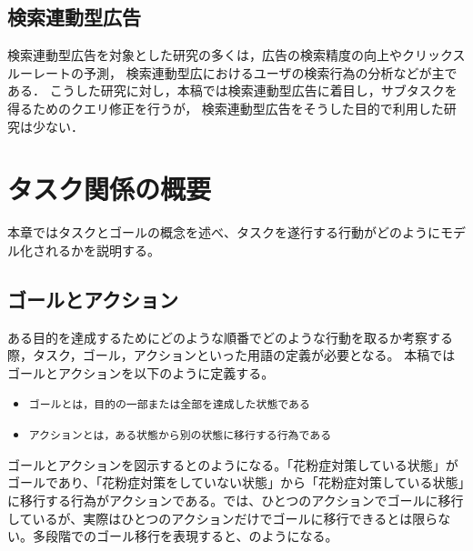 \documentclass[submit,techreq]{ipsj}
\def\|{\verb|}
\begin{document}
\subsection{検索連動型広告}
検索連動型広告を対象とした研究の多くは，広告の検索精度の向上\cite{BroderAdQueryExpansion}やクリックスルーレートの予測\cite{RichardsonEstimatingCTR}，
検索連動型広におけるユーザの検索行為の分析\cite{jansen2005examining,DanescuNiculescuMizilInterplayAd}などが主である．
こうした研究に対し，本稿では検索連動型広告に着目し，サブタスクを得るためのクエリ修正を行うが，
検索連動型広告をそうした目的で利用した研究は少ない\cite{yamamoto2012wisdom}．

%%あれ，これ日本語の文献なくね？？
%本稿では検索連動型広告に着目し，サブタスクを得るためのクエリ修正を行うが，
%検索連動型広告に着目した同様の研究として，田麦らの研究がある．
%田麦らは，``中古ギターを売りたい''という情報要求を持ったユーザの場合，``中古ギター　売却''というクエリでウェブ検索を行うよりも，``中古ギター　買い取り''というように，中古ギターの買い取り業者というサービス提供者側の視点に立ったクエリでウェブ検索をした方が，
%目的に適したページを得られやすいことを指摘している．
%彼らはこの点に着目し，検索連動型広告を用いることで，``売却''に対する``買い取り''のように，
%サービスを享受する側と提供する側で逆位関係にある動詞を自動的に発見し，クエリ拡張に用いる手法を提案している．


%2
\section{タスク関係の概要}
本章ではタスクとゴールの概念を述べ、タスクを遂行する行動がどのようにモデル化されるかを説明する。


%2.1
\subsection{ゴールとアクション}
ある目的を達成するためにどのような順番でどのような行動を取るか考察する際，タスク，ゴール，アクションといった用語の定義が必要となる。
本稿ではゴールとアクションを以下のように定義する。

\begin{itemize}
\item \|ゴールとは，目的の一部または全部を達成した状態である|
\item \|アクションとは，ある状態から別の状態に移行する行為である|
\end{itemize}

ゴールとアクションを図示するとのようになる。「花粉症対策している状態」がゴールであり、「花粉症対策をしていない状態」から「花粉症対策している状態」に移行する行為がアクションである。では、ひとつのアクションでゴールに移行しているが、実際はひとつのアクションだけでゴールに移行できるとは限らない。多段階でのゴール移行を表現すると、のようになる。
\end{document}
